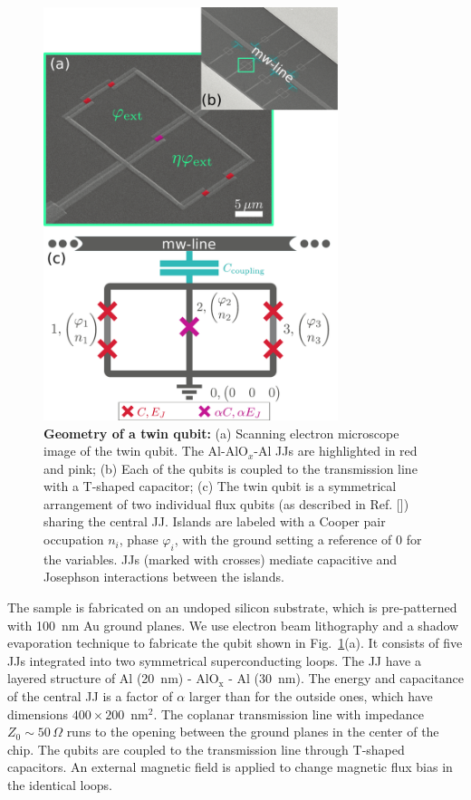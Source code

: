 \documentclass[%
reprint,
superscriptaddress,
bibnotes,
amsmath,
amssymb,
aps,
showkeys,
prb,
]{revtex4-2}
\begin{document}
\begin{figure}[htp]
\centering
  \includegraphics[width=8.6cm]{fig1}
  \caption{\small  \textbf{Geometry  of a  twin  qubit:}  (a) Scanning  electron
    microscope image of the twin qubit. The Al-AlO$_x$-Al JJs are highlighted in
    red and  pink; (b) Each  of the qubits is  coupled to the  transmission line
    with a T-shaped  capacitor; (c) The twin qubit is  a symmetrical arrangement
    of two individual  flux qubits (as described  in Ref. [\cite{Orlando_1999}]) sharing
    the central  JJ.  Islands are labeled  with a Cooper pair  occupation $n_i$,
    phase $\varphi_i$, with the  ground setting a reference of 0 for
    the variables.   JJs  (marked with  crosses)  mediate capacitive  and
    Josephson  interactions between  the islands.
  }
  \label{fig:setup}
\end{figure}

The sample is fabricated on an undoped silicon substrate, which is
pre-patterned with 100~nm Au ground planes. We  use electron beam lithography 
and a shadow evaporation  technique to fabricate the qubit shown in
Fig.~\ref{fig:setup}(a). It consists of five JJs integrated into two
symmetrical  superconducting  loops. The  JJ  have  a   layered  structure  of
Al (20~nm) - AlO$_{\text{x}}$ - Al (30~nm).  The energy  and  capacitance of  the
central JJ  is a  factor of  $\alpha$ larger than  for the  outside ones,  which have
dimensions $400\times200$~nm$^2$.    The  coplanar  transmission   line  with
impedance $ Z_{0} \sim 50\,\Omega $ runs to the opening between the ground planes in the
center of the chip. The qubits are coupled to the transmission line
through T-shaped  capacitors.  An external magnetic field is applied to change magnetic flux bias in the identical loops.
\end{document}
